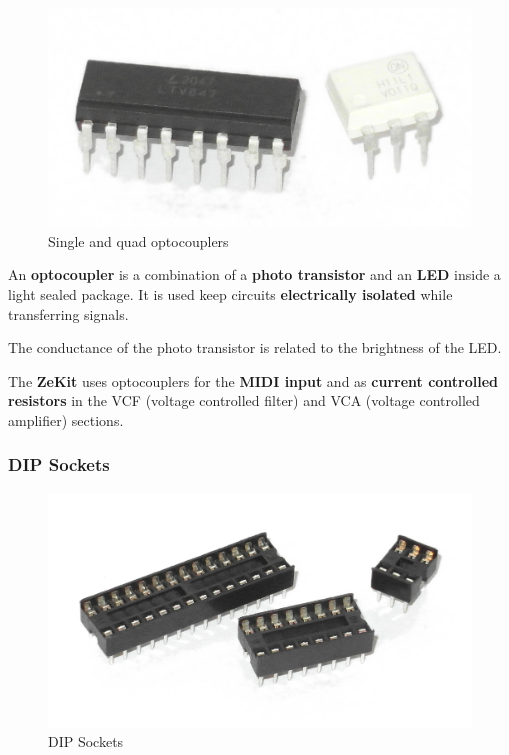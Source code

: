 \documentclass{scrartcl}
\begin{document}
\begin{figure}[!ht]
    \begin{center}
        \includegraphics[scale=0.20]{assets/zekit-optocouplers.jpg}
        \caption{Single and quad optocouplers}
    \end{center}
\end{figure}

An \textbf{optocoupler} is a combination of a \textbf{photo transistor} and an \textbf{LED} inside a light sealed package. It is used keep circuits \textbf{electrically isolated} while transferring signals.

The conductance of the photo transistor is related to the brightness of the LED.

The \textbf{ZeKit} uses optocouplers for the \textbf{MIDI input} and as \textbf{current controlled resistors} in the VCF (voltage controlled filter) and VCA (voltage controlled amplifier) sections.

\pagebreak
\subsubsection{DIP Sockets}

\begin{figure}[!ht]
    \begin{center}
        \includegraphics[scale=0.20]{assets/zekit-sockets.jpg}
        \caption{DIP Sockets}
    \end{center}
\end{figure}
\end{document}
